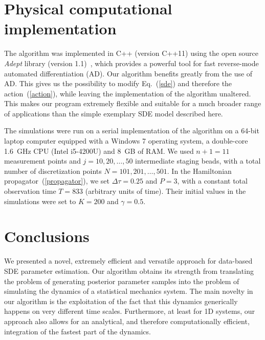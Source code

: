 \documentclass[11pt]{article}
\theoremstyle{definition}
\begin{document}
\section{Physical computational implementation}

The algorithm was implemented in C++ (version C++11) using the open source \emph{Adept} library (version 1.1)~\cite{Hogan_2014_adept}, which provides a powerful tool for fast reverse-mode automated differentiation (AD). Our algorithm benefits greatly from the use of AD. This gives us the possibility to modify Eq.~(\ref{sde}) and therefore the action~(\ref{action}), while leaving the implementation of the algorithm unaltered. This makes our program extremely flexible and suitable for a much broader range of applications than the simple exemplary SDE model described here.
%

The simulations were run on a serial implementation of the algorithm on a 64-bit laptop computer equipped with a Windows 7 operating system, a double-core 1.6~GHz CPU (Intel i5-4200U) and 8~GB of RAM. We used $n+1 = 11$ measurement points and $j = 10, 20,\dots, 50$ intermediate staging beads, with a total number of discretization points $N = 101, 201, \dots, 501$. In the Hamiltonian propagator~(\ref{propagator}), we set $\Delta\tau = 0.25$ and $P = 3$, with a constant total observation time $T = 833$ (arbitrary units of time).  Their initial values in the simulations were set to $K=200$ and $\gamma = 0.5$.
%




\section{Conclusions}

We presented a novel, extremely efficient and versatile approach for data-based SDE parameter estimation.
Our algorithm obtains its strength from translating the problem of generating posterior parameter samples into the problem of simulating the dynamics of a statistical mechanics system.
The main novelty in our algorithm is the exploitation of the fact that this dynamics generically happens on very different time scales.
Furthermore, at least for 1D systems, our approach also allows for an analytical, and therefore computationally efficient, integration of the fastest part of the dynamics.
\end{document}
